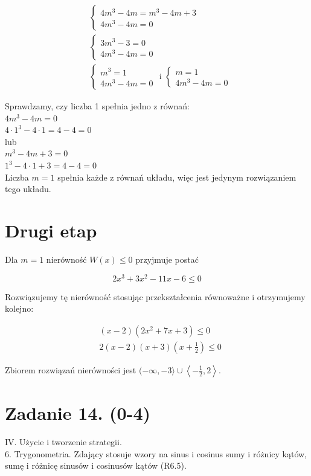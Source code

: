 \documentclass[10pt]{article}
\begin{document}
$$
\begin{aligned}
& \left\{\begin{array}{l}
4 m^{3}-4 m=m^{3}-4 m+3 \\
4 m^{3}-4 m=0
\end{array}\right. \\
& \left\{\begin{array}{l}
3 m^{3}-3=0 \\
4 m^{3}-4 m=0
\end{array}\right. \\
& \left\{\begin{array} { l } 
{ m ^ { 3 } = 1 } \\
{ 4 m ^ { 3 } - 4 m = 0 }
\end{array} \text { i } \left\{\begin{array}{l}
m=1 \\
4 m^{3}-4 m=0
\end{array}\right.\right.
\end{aligned}
$$

Sprawdzamy, czy liczba 1 spełnia jedno z równań:\\
$4 m^{3}-4 m=0$\\
$4 \cdot 1^{3}-4 \cdot 1=4-4=0$\\
lub\\
$m^{3}-4 m+3=0$\\
$1^{3}-4 \cdot 1+3=4-4=0$\\
Liczba $m=1$ spełnia każde z równań układu, więc jest jedynym rozwiązaniem tego układu.

\section*{Drugi etap}
Dla $m=1$ nierówność $W(x) \leq 0$ przyjmuje postać

$$
2 x^{3}+3 x^{2}-11 x-6 \leq 0
$$

Rozwiązujemy tę nierówność stosując przekształcenia równoważne i otrzymujemy kolejno:

$$
\begin{aligned}
& (x-2)\left(2 x^{2}+7 x+3\right) \leq 0 \\
& 2(x-2)(x+3)\left(x+\frac{1}{2}\right) \leq 0
\end{aligned}
$$

Zbiorem rozwiązań nierówności jest $(-\infty,-3\rangle \cup\left\langle-\frac{1}{2}, 2\right\rangle$.

\section*{Zadanie 14. (0-4)}
IV. Użycie i tworzenie strategii.\\
6. Trygonometria. Zdający stosuje wzory na sinus i cosinus sumy i różnicy kątów, sumę i różnicę sinusów i cosinusów kątów (R6.5).
\end{document}
